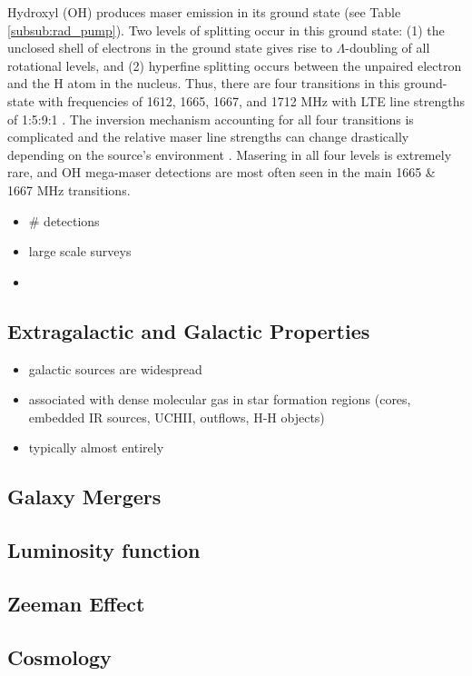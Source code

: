 
Hydroxyl (OH) produces maser emission in its ground state (see Table \ref{subsub:rad_pump}). Two levels of splitting occur in this ground state: (1) the unclosed shell of electrons in the ground state gives rise to $\Lambda$-doubling of all rotational levels, and (2) hyperfine splitting occurs between the unpaired electron and the H atom in the nucleus. Thus, there are four transitions in this ground-state with frequencies of 1612, 1665, 1667, and 1712 MHz with LTE line strengths of 1:5:9:1 \cite{lo2005}. The inversion mechanism accounting for all four transitions is complicated \citep{Elitzur_1992} and the relative maser line strengths can change drastically depending on the source's environment \citep{lo2005}. Masering in all four levels is extremely rare, and OH mega-maser detections are most often seen in the main 1665 \& 1667 MHz transitions. 

\begin{itemize}
\item # detections
\item large scale surveys
\item 
\end{itemize}


\subsection{Extragalactic and Galactic Properties}
\label{sub:oh_gal_props}

\begin{itemize}
\item galactic sources are widespread
\item associated with dense molecular gas in star formation regions (cores, embedded IR sources, UCHII, outflows, H-H objects)
\item typically almost entirely 
\end{itemize}

\subsection{Galaxy Mergers}

\subsection{Luminosity function}

\subsection{Zeeman Effect}

\subsection{Cosmology}
